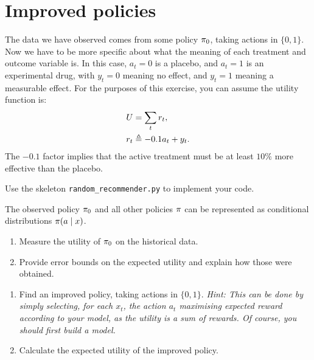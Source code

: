 \section{Improved policies}

The data we have observed comes from some policy $\pi_0$, taking actions in $\{0,1\}$. Now we have to be more specific about what the meaning of each treatment and outcome variable is. In this case, $a_t = 0$ is a placebo, and $a_t = 1$ is an experimental drug, with $y_t = 0$ meaning no effect, and $y_t = 1$ meaning a measurable effect. For the purposes of this exercise, you can assume the utility function is:
\begin{align}
  U &= \sum_t r_t,\\
  r_t &\mathrel{\triangleq} - 0.1 a_t + y_t.
\end{align}
The $-0.1$ factor implies that the active treatment must be at least $10\%$ more effective than the placebo.

Use the skeleton \verb!random_recommender.py! to implement your code.

\begin{assumption}
  The observed policy $\pi_0$ and all other policies $\pi$ can be represented as conditional distributions $\pi(a \mid x)$. 
\end{assumption}

\begin{exercise}
  \begin{enumerate}
  \item Measure the utility of $\pi_0$ on the historical
    data.
  \item Provide error bounds on the expected utility and explain how those were obtained.
  \end{enumerate}
\end{exercise}

\begin{exercise}
  \begin{enumerate}
  \item Find an improved policy, taking actions in $\{0,1\}$. \emph{Hint: This can be done by simply selecting, for each $x_t$, the action $a_t$ maximising expected reward according to your model, as the utility is a sum of rewards. Of course, you should first build a model.}
  \item Calculate the expected utility of the improved policy.
  \end{enumerate}
\end{exercise}

\begin{exercise}
  
\end{exercise}





